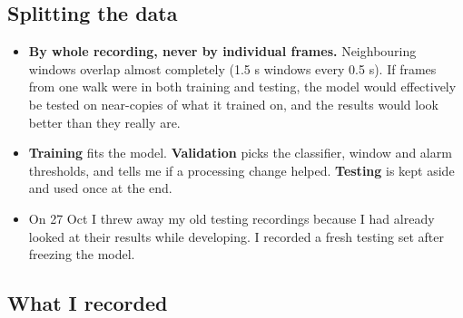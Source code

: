 \documentclass[11pt,a4paper]{article}
\providecommand{\tightlist}{\setlength{\itemsep}{0pt}\setlength{\parskip}{0pt}}
\begin{document}
\hypertarget{splitting-the-data}{%
\subsection{Splitting the
data}\label{splitting-the-data}}

\begin{itemize}
\tightlist
\item
  \textbf{By whole recording,
  never by individual frames.}
  Neighbouring windows overlap
  almost completely (1.5 s
  windows every 0.5 s). If
  frames from one walk were in
  both training and testing,
  the model would effectively
  be tested on near-copies of
  what it trained on, and the
  results would look better
  than they really are.
\item
  \textbf{Training} fits the
  model. \textbf{Validation}
  picks the classifier, window
  and alarm thresholds, and
  tells me if a processing
  change helped.
  \textbf{Testing} is kept
  aside and used once at the
  end.
\item
  On 27 Oct I threw away my
  old testing recordings
  because I had already looked
  at their results while
  developing. I recorded a
  fresh testing set after
  freezing the model.
\end{itemize}

\hypertarget{what-i-recorded}{%
\subsection{What I
recorded}\label{what-i-recorded}}
\end{document}

